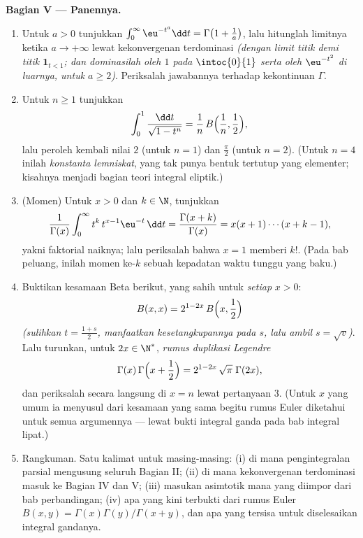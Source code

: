 \begin{problem}
\medskip
\noindent\textbf{Bagian V --- Panennya.}
\begin{enumerate}[resume]
  \item Untuk $a > 0$ tunjukkan $\int_0^\infty \eu^{-t^a}\dd t =
        \Gamma\bigl(1 + \frac1a\bigr)$, lalu hitunglah limitnya ketika
        $a \to +\infty$ lewat kekonvergenan terdominasi \emph{(dengan
        limit titik demi titik $\mathbf 1_{t < 1}$; dan dominasilah oleh
        $1$ pada $\intoc{0}{1}$ serta oleh $\eu^{-t^2}$ di luarnya,
        untuk $a \geq 2$)}. Periksalah jawabannya terhadap kekontinuan
        $\Gamma$.
  \item Untuk $n \geq 1$ tunjukkan
        \[
        \int_0^1 \frac{\dd t}{\sqrt{1 - t^n}}
        = \frac1n\,B\Bigl(\frac1n, \frac12\Bigr),
        \]
        lalu peroleh kembali nilai $2$ (untuk $n = 1$) dan $\frac\pi2$
        (untuk $n = 2$). (Untuk $n = 4$ inilah \emph{konstanta
        lemniskat}, yang tak punya bentuk tertutup yang elementer;
        kisahnya menjadi bagian teori integral eliptik.)
  \item (Momen) Untuk $x > 0$ dan $k \in \N$, tunjukkan
        \[
        \frac{1}{\Gamma(x)}\int_0^\infty
        t^{k}\,t^{x-1}\eu^{-t}\,\dd t
        = \frac{\Gamma(x+k)}{\Gamma(x)}
        = x(x+1)\cdots(x+k-1),
        \]
        yakni faktorial naiknya; lalu periksalah bahwa $x = 1$ memberi
        $k!$. (Pada bab peluang, inilah momen ke-$k$ sebuah kepadatan
        waktu tunggu yang baku.)
  \item Buktikan kesamaan Beta berikut, yang sahih untuk \emph{setiap}
        $x > 0$:
        \[
        B(x, x) = 2^{1-2x}\,B\Bigl(x, \frac12\Bigr)
        \]
        \emph{(sulihkan $t = \frac{1+s}2$, manfaatkan
        kesetangkupannya pada $s$, lalu ambil $s = \sqrt v$)}. Lalu
        turunkan, untuk $2x \in \N^*$, \emph{rumus duplikasi Legendre}
        \[
        \Gamma(x)\,\Gamma\Bigl(x + \frac12\Bigr)
        = 2^{1-2x}\,\sqrt\pi\;\Gamma(2x),
        \]
        dan periksalah secara langsung di $x = n$ lewat pertanyaan 3.
        (Untuk $x$ yang umum ia menyusul dari kesamaan yang sama begitu
        rumus Euler diketahui untuk semua argumennya --- lewat bukti
        integral ganda pada bab integral lipat.)
  \item Rangkuman. Satu kalimat untuk masing-masing: (i) di mana
        pengintegralan parsial mengusung seluruh Bagian II; (ii) di mana
        kekonvergenan terdominasi masuk ke Bagian IV dan V; (iii)
        masukan asimtotik mana yang diimpor dari bab
        perbandingan; (iv) apa yang kini terbukti dari rumus Euler
        $B(x,y) = \Gamma(x)\Gamma(y)/\Gamma(x+y)$, dan apa yang
        tersisa untuk diselesaikan integral gandanya.

\end{enumerate}
\end{problem}
